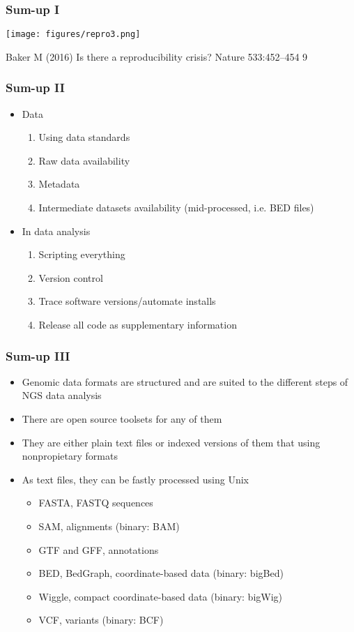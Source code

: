 \documentclass{beamer}
\begin{document}
\begin{frame}
  \frametitle{Sum-up I}
\centering
\texttt{[image: figures/repro3.png]}

{\tiny Baker M (2016) Is there a reproducibility crisis? Nature 533:452–454 9}
\end{frame}



\begin{frame}
  \frametitle{Sum-up II}
  \begin{itemize}
  \item Data
    \begin{enumerate}
    \item Using data standards
    \item Raw data availability
    \item Metadata
    \item Intermediate datasets availability (mid-processed, i.e. BED files)
    \end{enumerate}
  \item In data analysis
    \begin{enumerate}
    \item Scripting everything
    \item Version control
    \item Trace software versions/automate installs
    \item Release all code as supplementary information
    \end{enumerate}
  \end{itemize}
\end{frame}


\begin{frame}
  \frametitle{Sum-up III}

  \begin{itemize}
  \item Genomic data formats are structured and are suited to the different steps of NGS data analysis
  \item There are open source toolsets for any of them
  \item They are either plain text files or indexed versions of them that using nonpropietary formats
  \item As text files, they can be fastly processed using Unix
    \begin{itemize}
    \item FASTA, FASTQ sequences
    \item SAM, alignments (binary: BAM)
    \item GTF and GFF, annotations
    \item BED, BedGraph, coordinate-based data (binary: bigBed)
    \item Wiggle, compact coordinate-based data (binary: bigWig)
    \item VCF, variants (binary: BCF)
    \end{itemize}
  \end{itemize}

\end{frame}
\end{document}

